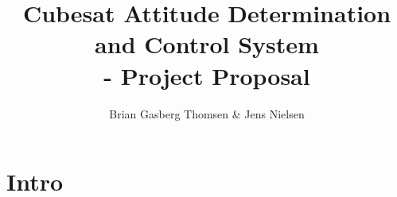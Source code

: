 \documentclass[10pt,a4paper,oneside,openany,article]{memoir}
\title{\vspace{-2cm} Cubesat Attitude Determination and Control System \\ \Large - Project Proposal}
\author{Brian Gasberg Thomsen \& Jens Nielsen}
\begin{document}
\maketitle

\chapter{Intro}
\end{document}
